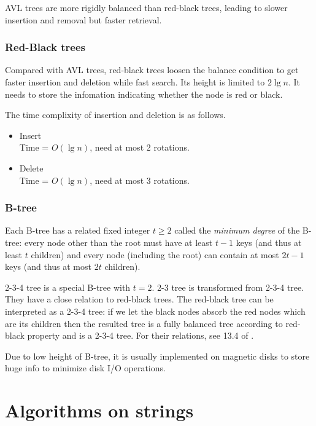 \documentclass[12pt]{article}
\begin{document}
AVL trees are more rigidly balanced than red-black trees, leading to slower
insertion and removal but faster retrieval.

\subsubsection{Red-Black trees}

Compared with AVL trees, red-black trees loosen the balance condition to
get faster insertion and deletion while fast search.  Its height is limited
to $2\lg n$.  It needs to store the infomation indicating whether the node
is red or black.

The time complixity of insertion and deletion is as follows.
    \begin{itemize}
        \item Insert \\
            Time = $O(\lg n)$, need at most 2 rotations.
        \item Delete \\
            Time = $O(\lg n)$, need at most 3 rotations.
    \end{itemize}


\subsubsection{B-tree}

Each B-tree has a related fixed integer $t \geq 2$ called the {\em minimum
degree} of the B-tree: every node other than the root must have at least
$t-1$ keys (and thus at least $t$ children) and every node (including the
root) can contain at most $2t-1$ keys (and thus at most $2t$ children).

2-3-4 tree is a special B-tree with $t=2$.  2-3 tree is transformed from
2-3-4 tree.  They have a close relation to red-black trees.  The red-black
tree can be interpreted as a 2-3-4 tree: if we let the black nodes absorb
the red nodes which are its children then the resulted tree is a
fully balanced tree according to red-black property and is a 2-3-4 tree.
For their relations, see 13.4 of \cite{Sedgewick98}.

Due to low height of B-tree, it is usually implemented on magnetic disks to
store huge info to minimize disk I/O operations.


\section{Algorithms on strings}
\end{document}
